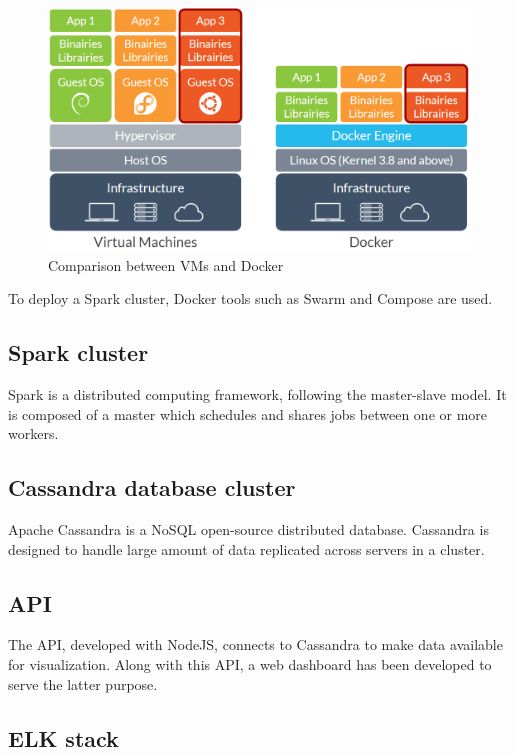 \documentclass[11pt]{article}
\begin{document}
\begin{figure}[h!]
    \centering
    \includegraphics[scale=0.4]{img/docker-vs-vm.png}
    \caption{Comparison between VMs and Docker}
    \label{docker-vs-vm}
\end{figure}

To deploy a Spark cluster, Docker tools such as Swarm and Compose are used. %

\subsection{Spark cluster}

Spark is a distributed computing framework, following the master-slave model. It is composed of a master which schedules and shares jobs between one or more workers.

\subsection{Cassandra database cluster}

Apache Cassandra is a NoSQL open-source distributed database. Cassandra is designed to handle large amount of data replicated across servers in a cluster.

\subsection{API}

The API, developed with NodeJS, connects to Cassandra to make data available for visualization. Along with this API, a web dashboard has been developed to serve the latter purpose.

\subsection{ELK stack}
\end{document}
